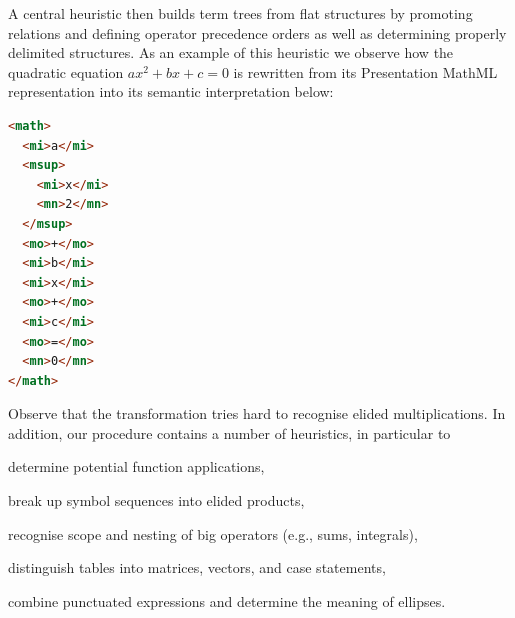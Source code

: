 \documentclass{llncs}
\begin{document}
A central heuristic then builds term trees from flat structures by promoting
relations and defining operator precedence orders as well as determining
properly delimited structures. As an example of this heuristic we observe how
the quadratic equation $ax^2 + bx + c = 0$ is rewritten from its
Presentation MathML representation into its semantic interpretation below:

\begin{minipage}{0.35\textwidth}
\begin{lstlisting}[language=html]
<math>
  <mi>a</mi>
  <msup>
    <mi>x</mi>
    <mn>2</mn>
  </msup>
  <mo>+</mo>
  <mi>b</mi>
  <mi>x</mi>
  <mo>+</mo>
  <mi>c</mi>
  <mo>=</mo>
  <mn>0</mn>
</math>
\end{lstlisting}
\end{minipage}
\begin{minipage}{0.6\textwidth}

\end{minipage}

Observe that the transformation tries hard to recognise elided multiplications.
In addition, our procedure contains a number of heuristics, in particular to
\begin{inparaenum}
 \item determine potential function applications,
 \item break up symbol sequences into elided products,
 \item recognise scope and nesting of big operators (e.g., sums, integrals),
 \item distinguish tables into matrices, vectors, and case statements,
 \item combine punctuated expressions and determine the meaning of ellipses.
\end{inparaenum}
\end{document}
